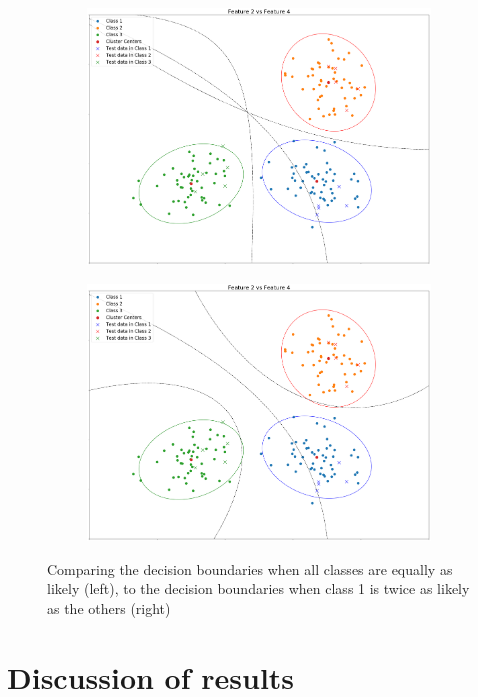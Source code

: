 \documentclass[a4paper]{article}
\begin{document}
\begin{figure}
\begin{subfigure}[h]{0.5\columnwidth}
\includegraphics[width=\columnwidth]{plot4.png}
\end{subfigure}
\hfill
\begin{subfigure}[h]{0.5\columnwidth}
\includegraphics[width=\columnwidth]{plot5.png}
\end{subfigure}%
\caption{Comparing the decision boundaries when all classes are equally as likely (left), to the decision boundaries when class 1 is twice as likely as the others (right)}
\end{figure}

\section{Discussion of results}
\end{document}
